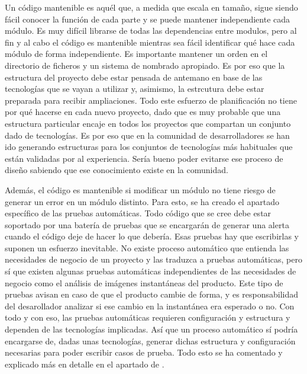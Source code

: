 Un código mantenible es aquél que, a medida que escala en tamaño, sigue siendo fácil conocer la función de cada parte y se puede mantener independiente cada módulo. Es muy difícil librarse de todas las dependencias entre modulos, pero al fin y al cabo el código es mantenible mientras sea fácil identificar qué hace cada módulo de forma independiente. Es importante mantener un orden en el directorio de ficheros y un sistema de nombrado apropiado. Es por eso que la estructura del proyecto debe estar pensada de antemano en base de las tecnologías que se vayan a utilizar y, asimismo, la estrcutura debe estar preparada para recibir ampliaciones. Todo este esfuerzo de planificación no tiene por qué hacerse en cada nuevo proyecto, dado que es muy probable que una estructura particular encaje en todos los proyectos que compartan un conjunto dado de tecnologías. Es por eso que en la comunidad de desarrolladores se han ido generando estructuras para los conjuntos de tecnologías más habituales que están validadas por al experiencia. Sería bueno poder evitarse ese proceso de diseño sabiendo que ese conocimiento existe en la comunidad.

Además, el código es mantenible si modificar un módulo no tiene riesgo de generar un error en un módulo distinto. Para esto, se ha creado el apartado específico de las pruebas automáticas. Todo código que se cree debe estar soportado por una batería de pruebas que se encargarán de generar una alerta cuando el código deje de hacer lo que debería. Esas pruebas hay que escribirlas y suponen un esfuerzo inevitable. No existe proceso automático que entienda las necesidades de negocio de un proyecto y las traduzca a pruebas automáticas, pero sí que existen algunas pruebas automáticas independientes de las necesidades de negocio como el análisis de imágenes instantáneas del producto. Este tipo de pruebas avisan en caso de que el producto cambie de forma, y es responsabilidad del desarollador analizar si ese cambio en la instantánea era esperado o no. Con todo y con eso, las pruebas automáticas requieren configuración y estructura y dependen de las tecnologías implicadas. Así que un proceso automático sí podría encargarse de, dadas unas tecnologías, generar dichas estructura y configuración necesarias para poder escribir casos de prueba. Todo esto se ha comentado y explicado más en detalle en el apartado de .


